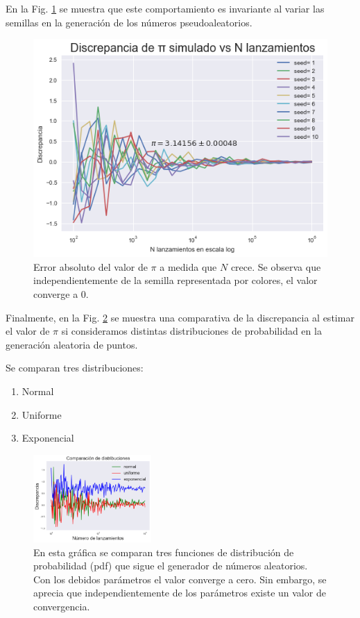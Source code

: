 \documentclass{rbf}
\begin{document}
En la Fig. \ref{buff4} se muestra que este comportamiento es invariante al variar las semillas en la generación de los números pseudoaleatorios. 


\begin{figure}[tp]
  \includegraphics[scale=0.5]{figures/errors.png}
    \caption{Error absoluto del valor de $\pi$ a medida que $N$ crece. Se observa que independientemente de la semilla representada por colores, el valor converge a 0.}
 \label{buff4}
\end{figure}

Finalmente, en la Fig. \ref{buff5} se muestra una comparativa de la discrepancia al estimar el valor de $\pi$ si consideramos distintas distribuciones de probabilidad en la generación aleatoria de puntos.

Se comparan tres distribuciones:
\begin{enumerate}
    \item Normal
    \item Uniforme
    \item Exponencial
\end{enumerate}

\begin{figure}[tbp!]
 \centering
  \includegraphics[width=0.4\textwidth]{figures/dist.png}
	\caption{En esta gráfica se comparan tres funciones de distribución de probabilidad (pdf) que sigue el generador de números aleatorios. Con los debidos parámetros el valor converge a cero. Sin embargo, se aprecia que independientemente de los parámetros existe un valor de convergencia. }
 \label{buff5}
\end{figure}
\end{document}
